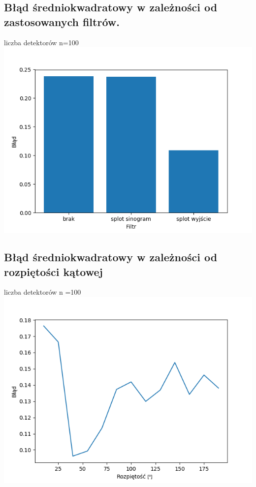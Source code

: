 \documentclass{article}
\begin{document}
\subsection{Błąd średniokwadratowy w zależności od zastosowanych filtrów.}
liczba detektorów n=100
\includegraphics[width=\textwidth]{wykres2}

\subsection{Błąd średniokwadratowy w zależności od rozpiętości kątowej}
liczba detektorów n =100
\includegraphics[width=\textwidth]{wykres3}
\centering
 
\end{document}
